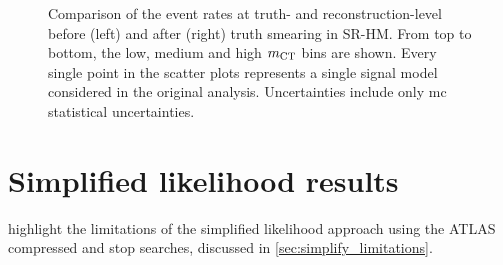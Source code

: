\begin{figure}
\begin{subfigure}[b]{0.49\linewidth}
	\end{subfigure}
	\caption{Comparison of the event rates at truth- and reconstruction-level before (left) and after (right) truth smearing in SR-HM. From top to bottom, the low, medium and high $m_{\textrm{CT}}$ bins are shown. Every single point in the scatter plots represents a single signal model considered in the original \onelepton analysis. Uncertainties include only \gls{mc} statistical uncertainties.}
	\label{fig:smearing_signal_regions_3}
\end{figure}


\FloatBarrier

\graphicspath{{chapter-simplify/Figs/Vector/}{chapter-simplify/Figs/}}

\section{Simplified likelihood results}


 highlight the limitations of the simplified likelihood approach using the ATLAS compressed and stop searches, discussed in \cref{sec:simplify_limitations}.


